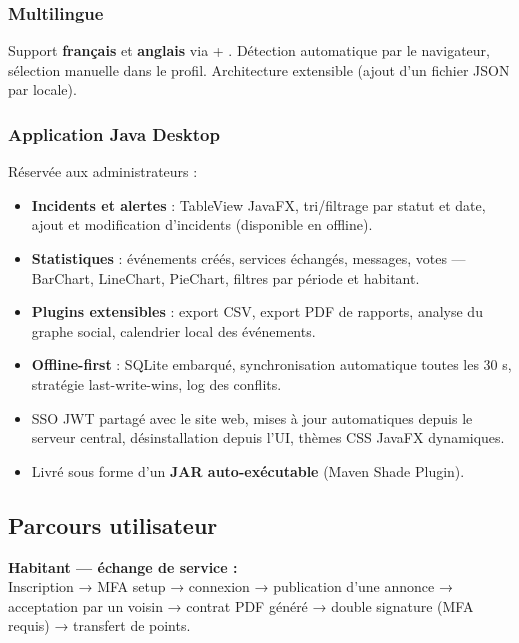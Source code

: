\documentclass[12pt,a4paper]{article}
\begin{document}
\subsubsection{Multilingue}

Support \textbf{français} et \textbf{anglais} via  +
. Détection automatique par le navigateur, sélection manuelle
dans le profil. Architecture extensible (ajout d'un fichier JSON par locale).

\subsubsection{Application Java Desktop}

Réservée aux administrateurs :
\begin{itemize}
    \item \textbf{Incidents et alertes} : TableView JavaFX, tri/filtrage par statut
          et date, ajout et modification d'incidents (disponible en offline).
    \item \textbf{Statistiques} : événements créés, services échangés, messages,
          votes — BarChart, LineChart, PieChart, filtres par période et habitant.
    \item \textbf{Plugins extensibles} : export CSV, export PDF de rapports, analyse
          du graphe social, calendrier local des événements.
    \item \textbf{Offline-first} : SQLite embarqué, synchronisation automatique toutes
          les 30 s, stratégie last-write-wins, log des conflits.
    \item SSO JWT partagé avec le site web, mises à jour automatiques depuis le
          serveur central, désinstallation depuis l'UI, thèmes CSS JavaFX dynamiques.
    \item Livré sous forme d'un \textbf{JAR auto-exécutable} (Maven Shade Plugin).
\end{itemize}

\newpage

\subsection{Parcours utilisateur}

\textbf{Habitant — échange de service :}\\
Inscription → MFA setup → connexion → publication d'une annonce → acceptation par un
voisin → contrat PDF généré → double signature (MFA requis) → transfert de points.
\end{document}
